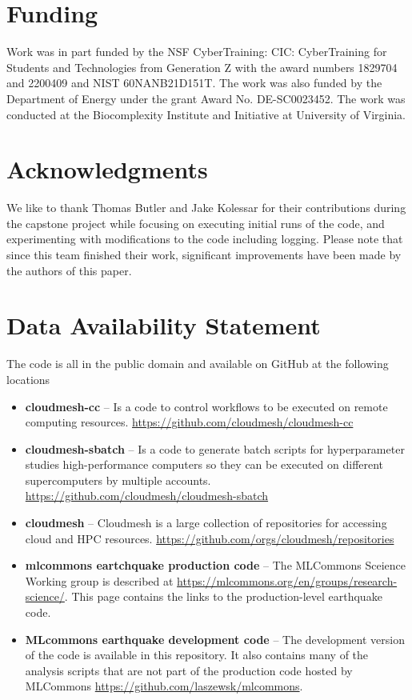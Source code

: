 \documentclass[utf8]{FrontiersinVancouver} %
\begin{document}
\section*{Funding}

Work was in part funded by the NSF CyberTraining: CIC: CyberTraining
for Students and Technologies from Generation Z with the award numbers
1829704 and 2200409 and NIST 60NANB21D151T.  The work was also funded
by the Department of Energy under the grant Award
No. DE-SC0023452. The work was conducted at the Biocomplexity
Institute and Initiative at University of Virginia.

\section*{Acknowledgments}

We like to thank Thomas Butler and Jake Kolessar for their
contributions during the capstone project while focusing on executing
initial runs of the code, and experimenting with modifications to the
code including logging. Please note that since this team finished
their work, significant improvements have been made by the authors of
this paper.



\section*{Data Availability Statement}

The code is all in the public domain and available on GitHub at the following locations

\begin{itemize}

\item {\bf cloudmesh-cc} -- Is a code to control workflows to be executed on
  remote computing
  resources. \url{https://github.com/cloudmesh/cloudmesh-cc}

\item {\bf cloudmesh-sbatch} -- Is a code to generate batch scripts for
  hyperparameter studies high-performance computers so they can be
  executed on different supercomputers by multiple
  accounts. \url{https://github.com/cloudmesh/cloudmesh-sbatch}

\item {\bf cloudmesh} -- Cloudmesh is a large collection of repositories for
  accessing cloud and HPC
  resources. \url{https://github.com/orgs/cloudmesh/repositories}

\item {\bf mlcommons eartchquake production code} -- The MLCommons Sceience
  Working group is described at
  \url{https://mlcommons.org/en/groups/research-science/}. This page
  contains the links to the production-level earthquake code.

\item {\bf MLcommons earthquake development code} -- The development version of
  the code is available in this repository. It also contains many of
  the analysis scripts that are not part of the production code
  hosted by MLCommons \url{https://github.com/laszewsk/mlcommons}.

\end{itemize}
\end{document}
